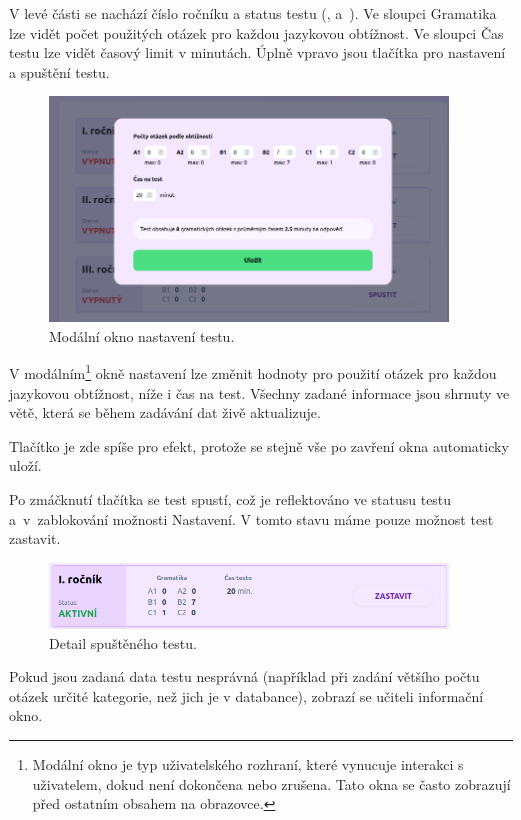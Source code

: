 V levé části se nachází číslo ročníku a status testu (,  a~). Ve sloupci Gramatika lze vidět počet použitých otázek pro každou jazykovou obtížnost. Ve sloupci Čas testu lze vidět časový limit v minutách. Úplně vpravo jsou tlačítka pro nastavení a spuštění testu.

\begin{figure}[H]
    \centering
    \includegraphics[width=400px]{images/01design/test-modal.png}
    \caption{Modální okno nastavení testu.}
\end{figure}

V modálním\footnote{Modální okno je typ uživatelského rozhraní, které vynucuje interakci s uživatelem, dokud není dokončena nebo zrušena. Tato okna se často zobrazují před ostatním obsahem na obrazovce.} okně nastavení lze změnit hodnoty pro použití otázek pro každou jazykovou obtížnost, níže i čas na test. Všechny zadané informace jsou shrnuty ve větě, která se během zadávání dat živě aktualizuje.

Tlačítko  je zde spíše pro efekt, protože se stejně vše po zavření okna automaticky uloží.

Po zmáčknutí tlačítka  se test spustí, což je reflektováno ve statusu testu a~v~zablokování možnosti Nastavení. V tomto stavu máme pouze možnost test zastavit.

\begin{figure}[H]
    \centering
    \includegraphics[width=400px]{images/01design/test-running.png}
    \caption{Detail spuštěného testu.}
\end{figure}

Pokud jsou zadaná data testu nesprávná (například při zadání většího počtu otázek určité kategorie, než jich je v databance), zobrazí se učiteli informační okno.

